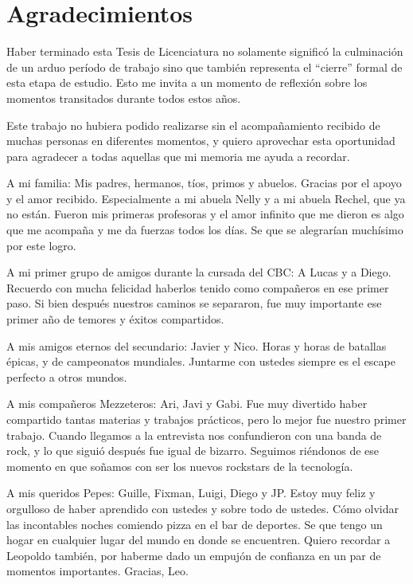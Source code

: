 \chapter*{Agradecimientos}

Haber terminado esta Tesis de Licenciatura no solamente significó la culminación de un arduo período de trabajo sino que también representa el ``cierre'' formal de esta etapa de estudio. Esto me invita a un momento de reflexión sobre los momentos transitados durante todos estos años. 

Este trabajo no hubiera podido realizarse sin el acompañamiento recibido de muchas personas en diferentes momentos, y quiero aprovechar esta oportunidad para agradecer a todas aquellas que mi memoria me ayuda a recordar.  

A mi familia: Mis padres, hermanos, tíos, primos y abuelos. Gracias por el apoyo y el amor recibido. Especialmente a mi abuela Nelly y a mi abuela Rechel, que ya no están. Fueron mis primeras profesoras y el amor infinito que me dieron es algo que me acompaña y me da fuerzas todos los días. Se que se alegrarían muchísimo por este logro. 

A mi primer grupo de amigos durante la cursada del CBC: A Lucas y a Diego. Recuerdo con mucha felicidad haberlos tenido como compañeros en ese primer paso. Si bien después nuestros caminos se separaron, fue muy importante ese primer año de temores y éxitos compartidos.

A mis amigos eternos del secundario: Javier y Nico. Horas y horas de batallas épicas, y de campeonatos mundiales. Juntarme con ustedes siempre es el escape perfecto a otros mundos. 

A mis compañeros Mezzeteros: Ari, Javi y Gabi. Fue muy divertido haber compartido tantas materias y trabajos prácticos, pero lo mejor fue nuestro primer trabajo. Cuando llegamos a la entrevista nos confundieron con una banda de rock, y lo que siguió después fue igual de bizarro. Seguimos riéndonos de ese momento en que soñamos con ser los nuevos rockstars de la tecnología.

A mis queridos Pepes: Guille, Fixman, Luigi, Diego y JP. Estoy muy feliz y orgulloso de haber aprendido con ustedes y sobre todo de ustedes. Cómo olvidar las incontables noches comiendo pizza en el bar de deportes. Se que tengo un hogar en cualquier lugar del mundo en donde se encuentren. Quiero recordar a Leopoldo también, por haberme dado un empujón de confianza en un par de momentos importantes. Gracias, Leo.

